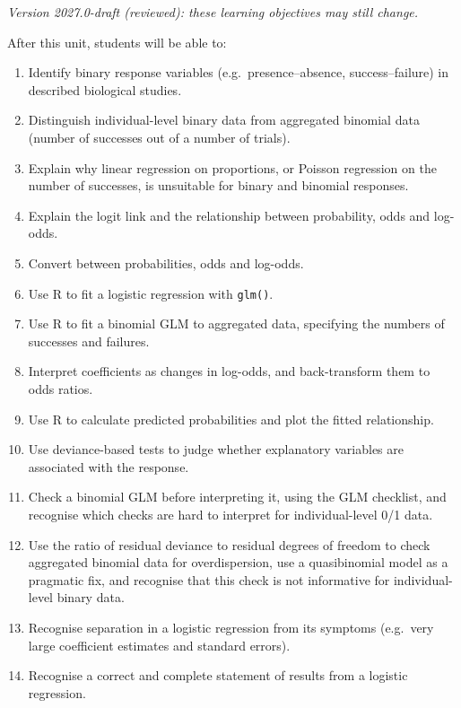 \documentclass[
  letterpaper,
  8pt,
  a4paper]{book}
\providecommand{\tightlist}{%
  \setlength{\itemsep}{0pt}\setlength{\parskip}{0pt}}
\begin{document}
\begin{tcolorbox}[enhanced jigsaw, arc=.35mm, bottomrule=.15mm, bottomtitle=1mm, breakable, colback=white, colbacktitle=quarto-callout-note-color!10!white, colframe=quarto-callout-note-color-frame, coltitle=black, left=2mm, leftrule=.75mm, opacityback=0, opacitybacktitle=0.6, rightrule=.15mm, title=\textcolor{quarto-callout-note-color}{\faInfo}\hspace{0.5em}{Learning objectives}, titlerule=0mm, toprule=.15mm, toptitle=1mm]

\emph{Version 2027.0-draft (reviewed): these learning objectives may
still change.}

After this unit, students will be able to:

\begin{enumerate}
\def\labelenumi{\arabic{enumi}.}
\tightlist
\item
  Identify binary response variables (e.g.~presence--absence,
  success--failure) in described biological studies.
\item
  Distinguish individual-level binary data from aggregated binomial data
  (number of successes out of a number of trials).
\item
  Explain why linear regression on proportions, or Poisson regression on
  the number of successes, is unsuitable for binary and binomial
  responses.
\item
  Explain the logit link and the relationship between probability, odds
  and log-odds.
\item
  Convert between probabilities, odds and log-odds.
\item
  Use R to fit a logistic regression with \texttt{glm()}.
\item
  Use R to fit a binomial GLM to aggregated data, specifying the numbers
  of successes and failures.
\item
  Interpret coefficients as changes in log-odds, and back-transform them
  to odds ratios.
\item
  Use R to calculate predicted probabilities and plot the fitted
  relationship.
\item
  Use deviance-based tests to judge whether explanatory variables are
  associated with the response.
\item
  Check a binomial GLM before interpreting it, using the GLM checklist,
  and recognise which checks are hard to interpret for individual-level
  0/1 data.
\item
  Use the ratio of residual deviance to residual degrees of freedom to
  check aggregated binomial data for overdispersion, use a quasibinomial
  model as a pragmatic fix, and recognise that this check is not
  informative for individual-level binary data.
\item
  Recognise separation in a logistic regression from its symptoms
  (e.g.~very large coefficient estimates and standard errors).
\item
  Recognise a correct and complete statement of results from a logistic
  regression.
\end{enumerate}


\end{tcolorbox}
\end{document}
